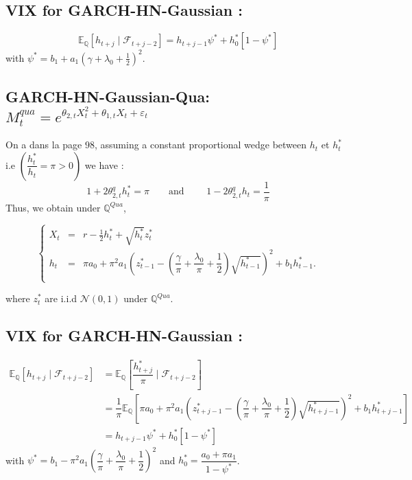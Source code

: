 \documentclass[preprint,times,12pt]{elsarticle}
\begin{document}
\subsection{VIX for  GARCH-HN-Gaussian :}
\begin{equation}
\mathbb{E}_\mathbb{Q}\left[ h_{t+j} \mid \mathcal{F}_{t+j-2}\right] =h_{t+j-1} \psi^{*}  + h_{0}^{*}\left[1-\psi^{*} \right]
\end{equation}
with  $ \psi^{*}=b_{1}+a_{1}(\gamma+\lambda_{0}+\frac{1}{2})^{2}$.




\subsection{ GARCH-HN-Gaussian-Qua: $M^{qua}_{t}=e^{\theta_{2,t}X^{2}_{t}+\theta_{1,t}X_{t}+\varepsilon_{t}}$}

On a dans la page $ 98 $, assuming a constant proportional wedge between $h_{t}$  et $h_{t}^{*}$ i.e $\left( \dfrac{h_{t}^{*}}{h_{t}}=\pi >0\right)$ we have :
\begin{equation*}
1+2 \theta_{2,t}^{q}h_{t}^{*}=\pi \qquad \text{and }\qquad 1-2 \theta_{2,t}^{q}h_{t}=\dfrac{1}{\pi}
\end{equation*}
Thus, we obtain under $ \mathbb{Q}^{Qua}$,

\begin{equation}\label{HestonNandiriskdynqua}
\left\{
  \begin{array}{rcl}
X_{t}& = & r-\frac{1}{2}h_{t}^{*} + \sqrt{h_{t}^{*}}z_{t}^{*}\\
h_{t}& = & \pi a_{0}+\pi^{2} a_{1}\left(z_{t-1}^{*}-\left(\dfrac{\gamma}{\pi}+\dfrac{\lambda_{0}}{\pi}+\dfrac{1}{2}\right)\sqrt{h_{t-1}^{*}} \right)^{2}+b_{1}h_{t-1}^{*}.\\
  \end{array}
\right.
\end{equation}

where $ z_{t}^{*} $ are  i.i.d $ \mathcal{N}(0,1) $ under $ \mathbb{Q}^{Qua}$.


\subsection{VIX for  GARCH-HN-Gaussian :}
\begin{align*}
\mathbb{E}_\mathbb{Q}\left[ h_{t+j} \mid \mathcal{F}_{t+j-2}\right] &=\mathbb{E}_\mathbb{Q}\left[ \dfrac{h^{*}_{t+j}}{\pi} \mid \mathcal{F}_{t+j-2}\right]\\ 
 &=\dfrac{1}{\pi}\mathbb{E}_\mathbb{Q}\left[ \pi a_{0}+\pi^{2} a_{1}\left(z_{t+j-1}^{*}-\left(\dfrac{\gamma}{\pi}+\dfrac{\lambda_{0}}{\pi}+\dfrac{1}{2}\right)\sqrt{h_{t+j-1}^{*}} \right)^{2}+b_{1}h_{t+j-1}^{*}\right]\\
 &= h_{t+j-1} \psi^{*}  + h_{0}^{*}\left[1-\psi^{*} \right]
\end{align*}
with  $ \psi^{*}= b_{1}-\pi^{2} a_{1}\left( \dfrac{\gamma}{\pi}+\dfrac{\lambda_{0}}{\pi}+\dfrac{1}{2}\right) ^{2}$ and $ h_{0}^{*}=\dfrac{  a_{0}+\pi  a_{1}}{1-\psi^{*}} $.
\end{document}
